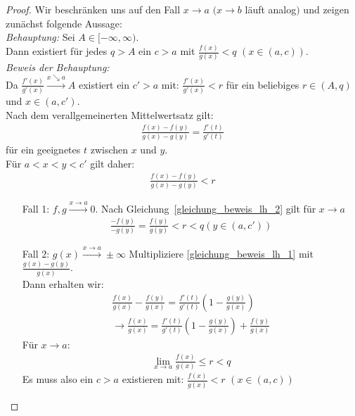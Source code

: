 \begin{proof}
	Wir beschränken uns auf den Fall $x \rightarrow a$ 
	$(x \rightarrow b$ läuft analog$)$ und zeigen zunächst folgende Aussage: \\
	\emph{Behauptung:} Sei $A \in [-\infty, \infty)$. \\ 
	Dann existiert für jedes $q > A$ ein $c > a$ mit $\frac{f(x)}{g(x)} < q$ $(x\in (a,c))$. \\
	\emph{Beweis der Behauptung:} \\
	Da $\frac{f'(x)}{g'(x)} \overset{x \searrow a}{\rightarrow} A$ 
	existiert ein $c' > a$ mit: $\frac{f'(x)}{g'(x)}<r$ für ein beliebiges 
	$r \in (A,q)$ und $x \in (a,c')$.\\
	Nach dem verallgemeinerten Mittelwertsatz gilt:
	\begin{align}
		\label{gleichung_beweis_lh_1}
		\frac{f(x)-f(y)}{g(x)-g(y)} = \frac{f'(t)}{g'(t)}
	\end{align}
	für ein geeignetes $t$ zwischen $x$ und $y$. \\
	Für $a < x < y <c'$ gilt daher:
	\begin{align}
		\label{gleichung_beweis_lh_2}
		\frac{f(x)-f(y)}{g(x)-g(y)} < r
	\end{align}
	\begin{itemize}
		\item[Fall 1:] $f,g \overset{x \rightarrow a}{\rightarrow} 0$. 
		Nach Gleichung~\eqref{gleichung_beweis_lh_2}
		gilt für $x \rightarrow a$ 
		\begin{align*}
			\frac{-f(y)}{-g(y)} = \frac{f(y)}{g(y)} < r <q (y \in (a, c'))
		\end{align*}
		\item[Fall 2:] $g(x) \overset{x \rightarrow a}{\rightarrow}\pm \infty$
		Multipliziere \eqref{gleichung_beweis_lh_1} mit
		$\frac{g(x)-g(y)}{g(x)}$. \\
		Dann erhalten wir:
		\begin{align*}
			\frac{f(x)}{g(x)} - \frac{f(y)}{g(x)} = \frac{f'(t)}{g'(t)}
			\left( 1 - \frac{g(y)}{g(x)}\right) \\
			 \rightarrow \frac{f(x)}{g(x)} = \frac{f'(t)}{g'(t)} \left(
			1- \frac{g(y)}{g(x)}\right) + \frac{f(y)}{g(x)}
		\end{align*}
		Für $x \rightarrow a$:
		\begin{align*}
			\lim\limits_{x\rightarrow a}{\frac{f(x)}{g(x)}}\leq r < q
		\end{align*}
		Es muss also ein $ c > a$ existieren mit: 
		$\frac{f(x)}{g(x)} <r$ $(x \in (a,c))$ \\

\end{itemize}
\end{proof}
